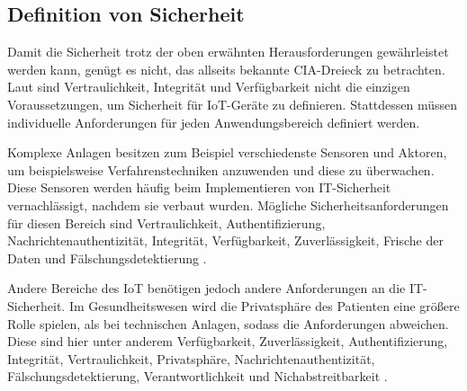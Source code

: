 \subsection{Definition von Sicherheit}
Damit die Sicherheit trotz der oben erwähnten Herausforderungen ge\-währ\-lei\-stet
werden kann, genügt es nicht, das allseits bekannte CIA-Dreieck zu betrachten.
Laut \cite{paper} sind Vertraulichkeit, Integrität und Verfügbarkeit nicht die
einzigen Voraussetzungen, um Sicherheit für IoT-Geräte zu definieren.
Stattdessen müssen individuelle Anforderungen für jeden Anwendungsbereich
definiert werden.

Komplexe Anlagen besitzen zum Beispiel verschiedenste Sensoren und Aktoren, um
beispielsweise Verfahrenstechniken anzuwenden und diese zu über\-wachen. Diese
Sensoren werden häufig beim Implementieren von IT-Sich\-er\-heit vernachlässigt,
nachdem sie verbaut wurden. Mögliche Sicherheitsanforderungen für
diesen Bereich sind Vertraulichkeit, Authentifizierung,
Nachrichtenauthentizität, Integrität, Verfügbarkeit, Zuverlässigkeit, Frische
der Daten und Fälschungsdetektierung \cite{paper}.

Andere Bereiche des IoT benötigen jedoch andere Anforderungen an die
IT-Sicherheit. Im Gesundheitswesen wird die Privatsphäre des Patienten eine
größere Rolle spielen, als bei technischen Anlagen, sodass die Anforderungen
abweichen. Diese sind hier unter anderem Verfügbarkeit, Zuverlässigkeit,
Authentifizierung, Integrität, Vertraulichkeit, Privatsphäre,
Nachrichtenauthentizität, Fälschungsdetektierung, Verantwortlichkeit und
Nichabstreitbarkeit \cite{paper}.
